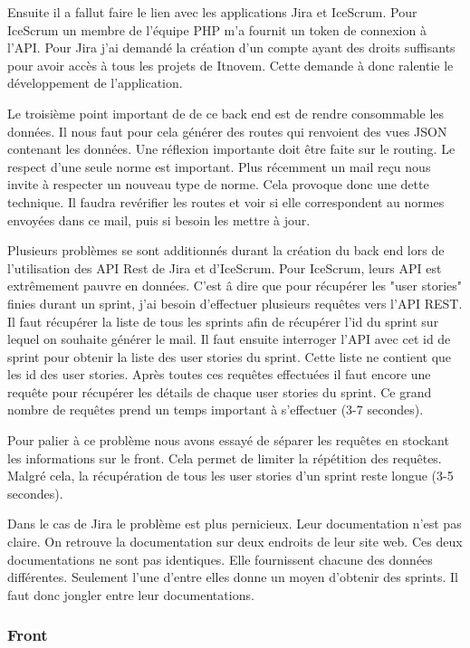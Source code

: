 \documentclass[12pt, twoside, openright]{report}
\begin{document}
Ensuite il a fallut faire le lien avec les applications Jira et IceScrum. Pour IceScrum un membre de l'équipe PHP m'a fournit un token de connexion à l'API. Pour Jira j'ai demandé la création d'un compte ayant des droits suffisants pour avoir accès à tous les projets de Itnovem. Cette demande à donc ralentie le développement de l'application.%

Le troisième point important de de ce back end est de rendre consommable les données. Il nous faut pour cela générer des routes qui renvoient des vues JSON contenant les données. Une réflexion importante doit être faite sur le routing. Le respect d'une seule norme est important. Plus récemment un mail reçu nous invite à respecter un nouveau type de norme. Cela provoque donc une dette technique. Il faudra revérifier les routes et voir si elle correspondent au normes envoyées dans ce mail, puis si besoin les mettre à jour. 

Plusieurs problèmes se sont additionnés durant la création du back end lors de l'utilisation des API Rest de Jira et d'IceScrum. Pour IceScrum, leurs API est extrêmement pauvre en données. C'est â dire que pour récupérer les "user stories" finies durant un sprint, j'ai besoin d'effectuer plusieurs requêtes vers l'API REST. Il faut récupérer la liste de tous les sprints afin de récupérer l'id du sprint sur lequel on souhaite générer le mail. Il faut ensuite interroger l'API avec cet id de sprint pour obtenir la liste des user stories du sprint. Cette liste ne contient que les id des user stories. Après toutes ces requêtes effectuées il faut encore une requête pour récupérer les détails de chaque user stories du sprint. Ce grand nombre de requêtes prend un temps important à s'effectuer (3-7 secondes).  

Pour palier à ce problème nous avons essayé de séparer les requêtes en stockant les informations sur le front. Cela permet de limiter la répétition des requêtes. Malgré cela, la récupération de tous les user stories d'un sprint reste longue (3-5 secondes).

Dans le cas de Jira le problème est plus pernicieux. Leur documentation n'est pas claire. On retrouve la documentation sur deux endroits de leur site web. Ces deux documentations ne sont pas identiques. Elle fournissent chacune des données différentes. Seulement l'une d'entre elles donne un moyen d'obtenir des sprints. Il faut donc jongler entre leur documentations. 

\subsubsection{Front}
\end{document}
